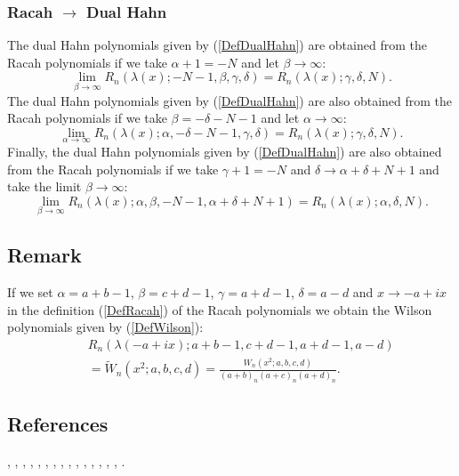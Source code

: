 \documentclass[envcountchap,graybox]{svmono}
\newcounter{rom}
\begin{document}
\subsubsection*{Racah $\rightarrow$ Dual Hahn}
The dual Hahn polynomials given by (\ref{DefDualHahn}) are obtained from the Racah polynomials
if we take $\alpha+1=-N$ and let $\beta\rightarrow\infty$:
\begin{equation}
\lim_{\beta\rightarrow\infty}
R_n(\lambda(x);-N-1,\beta,\gamma,\delta)=R_n(\lambda(x);\gamma,\delta,N).
\end{equation}
The dual Hahn polynomials given by (\ref{DefDualHahn}) are also obtained from the Racah polynomials
if we take $\beta=-\delta-N-1$ and let $\alpha\rightarrow\infty$:
\begin{equation}
\lim_{\alpha\rightarrow\infty}
R_n(\lambda(x);\alpha,-\delta-N-1,\gamma,\delta)=R_n(\lambda(x);\gamma,\delta,N).
\end{equation}
Finally, the dual Hahn polynomials given by (\ref{DefDualHahn}) are also obtained from the Racah polynomials
if we take $\gamma+1=-N$ and $\delta\rightarrow\alpha+\delta+N+1$ and take the limit $\beta\rightarrow\infty$:
\begin{equation}
\lim_{\beta\rightarrow\infty}
R_n(\lambda(x);\alpha,\beta,-N-1,\alpha+\delta+N+1)=R_n(\lambda(x);\alpha,\delta,N).
\end{equation}

\newpage

\subsection*{Remark}
If we set $\alpha=a+b-1$, $\beta=c+d-1$, $\gamma=a+d-1$, $\delta=a-d$ and $x\rightarrow
-a+ix$ in the definition (\ref{DefRacah}) of the Racah polynomials we obtain
the Wilson polynomials given by (\ref{DefWilson}):
\begin{eqnarray*}
& &R_n(\lambda(-a+ix);a+b-1,c+d-1,a+d-1,a-d)\\
& &{}=\tilde{W}_n(x^2;a,b,c,d)=\frac{W_n(x^2;a,b,c,d)}{(a+b)_n(a+c)_n(a+d)_n}.
\end{eqnarray*}

\subsection*{References}
\cite{Askey89I}, \cite{AskeyWilson79}, \cite{AskeyWilson85},
\cite{AtakRahmanSuslov}, \cite{AtakSuslov88}, \cite{Dunkl84},
\cite{Koorn88}, \cite{Lesky93}, \cite{Lesky95II}, \cite{LeskyWaibel},
\cite{Nikiforov+}, \cite{NikiforovUvarov}, \cite{Perlstadt}, \cite{Rahman80}, 
\cite{Rahman81II}, \cite{Wilson80}.
\end{document}
